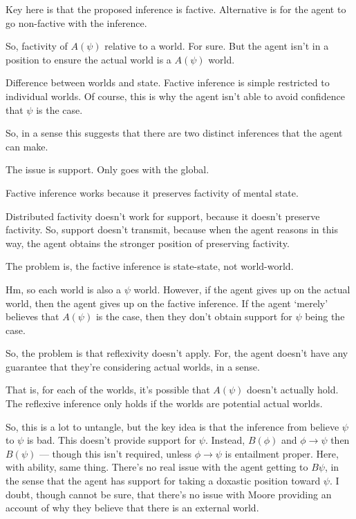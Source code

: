 \documentclass[10pt]{article}
\begin{document}
\begin{note}
  Key here is that the proposed inference is factive.
  Alternative is for the agent to go non-factive with the inference.

  So, factivity of \(A(\psi)\) relative to a world.
  For sure.
  But the agent isn't in a position to ensure the actual world is a \(A(\psi)\) world.

  Difference between worlds and state.
  Factive inference is simple restricted to individual worlds.
  Of course, this is why the agent isn't able to avoid confidence that \(\psi\) is the case.

  So, in a sense this suggests that there are two distinct inferences that the agent can make.

  The issue is support.
  Only goes with the global.

  Factive inference works because it preserves factivity of mental state.

  Distributed factivity doesn't work for support, because it doesn't preserve factivity.
  So, support doesn't transmit, because when the agent reasons in this way, the agent obtains the stronger position of preserving factivity.

  The problem is, the factive inference is state-state, not world-world.

  Hm, so each world is also a \(\psi\) world.
  However, if the agent gives up on the actual world, then the agent gives up on the factive inference.
  If the agent `merely' believes that \(A(\psi)\) is the case, then they don't obtain support for \(\psi\) being the case.

  So, the problem is that reflexivity doesn't apply.
  For, the agent doesn't have any guarantee that they're considering actual worlds, in a sense.

  That is, for each of the worlds, it's possible that \(A(\psi)\) doesn't actually hold.
  The reflexive inference only holds if the worlds are potential actual worlds.

  So, this is a lot to untangle, but the key idea is that the inference from believe \(\psi\) to \(\psi\) is bad.
  This doesn't provide support for \(\psi\).
  Instead, \(B(\phi)\) and \(\phi \rightarrow \psi\) then \(B(\psi)\) --- though this isn't required, unless \(\phi \rightarrow \psi\) is entailment proper.
  Here, with ability, same thing.
  There's no real issue with the agent getting to \(B\psi\), in the sense that the agent has support for taking a doxastic position toward \(\psi\).
  I doubt, though cannot be sure, that there's no issue with Moore providing an account of why they believe that there is an external world.
  
\end{note}
\end{document}
